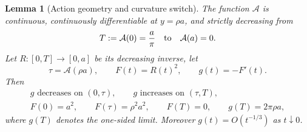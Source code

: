 \documentclass[11pt]{article}
\numberwithin{equation}{section}
\newtheorem{lemma}[theorem]{Lemma}
\theoremstyle{definition}
\theoremstyle{remark}
\begin{document}
\begin{lemma}[Action geometry and curvature switch]
\label{thin:lem-action-geometry}
The function \(\mathcal A\) is continuous, continuously differentiable at
\(y=\rho a\), and strictly decreasing from
\[
  T:=\mathcal A(0)=\frac a\pi
  \quad\hbox{to}\quad \mathcal A(a)=0.
\]
Let \(R:[0,T]\to[0,a]\) be its decreasing inverse, let
\[
  \tau=\mathcal A(\rho a),
  \qquad F(t)=R(t)^2,
  \qquad g(t)=-F'(t).
\]
Then
\begin{equation}
\begin{gathered}
  g\text{ decreases on }(0,\tau),
  \qquad g\text{ increases on }(\tau,T),\\
  F(0)=a^2,
  \qquad F(\tau)=\rho^2a^2,
  \qquad F(T)=0,
  \qquad g(T)=2\pi\rho a,
\end{gathered}
  \label{thin:eq-action-geometry}
\end{equation}
where \(g(T)\) denotes the one-sided limit.  Moreover \(g(t)=O(t^{-1/3})\)
as \(t\downarrow0\).
\end{lemma}
\end{document}
